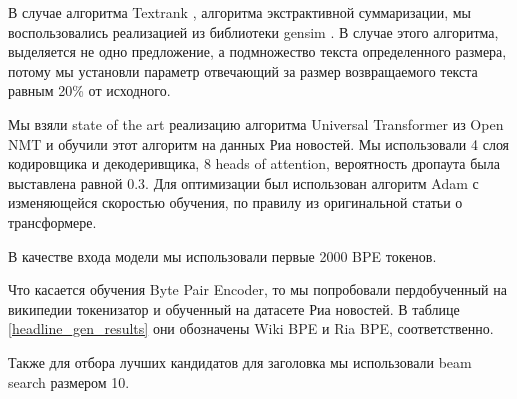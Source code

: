 \documentclass[14pt]{matmex-diploma-custom}
\begin{document}
В случае алгоритма Textrank \cite{DBLP:journals/corr/BarriosLAW16}, алгоритма экстрактивной суммаризации, мы воспользовались реализацией из библиотеки gensim \cite{rehurek_lrec}. В случае этого алгоритма, выделяется не одно предложение, а подмножество текста определенного размера, потому мы установли параметр отвечающий за размер возвращаемого текста равным 20\% от исходного.

Мы взяли state of the art реализацию алгоритма Universal Transformer из Open NMT \cite{2017opennmt} и обучили этот алгоритм на данных Риа новостей. Мы использовали 4 слоя кодировщика и декодеривщика, 8 heads of attention, вероятность дропаута была выставлена равной 0.3. Для оптимизации был использован алгоритм Adam с изменяющейся скоростью обучения, по правилу из оригинальной статьи о трансформере.

В качестве входа модели мы использовали первые 2000 BPE токенов.

Что касается обучения Byte Pair Encoder, то мы попробовали пердобученный на википедии токенизатор и обученный на датасете Риа новостей. В таблице \ref{headline_gen_results} они обозначены Wiki BPE и Ria BPE, соответственно.

Также для отбора лучших кандидатов для заголовка мы использовали beam search размером 10.
\end{document}
